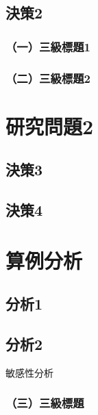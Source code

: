 \documentclass[14pt, a4paper,openany]{ctexbook} %
\numberwithin{figure}{chapter}
\numberwithin{table}{chapter}
\begin{document}
\subsection{決策2}




\subsubsection{（一）三級標題1}

\subsubsection{（二）三級標題2}

\section{研究問題2}

\subsection{決策3}







\subsection{決策4}



\section{算例分析}



\subsection{分析1}


\subsection{分析2}

敏感性分析

\vspace{-0.4cm}
\subsubsection{（三）三級標題}
\end{document}
